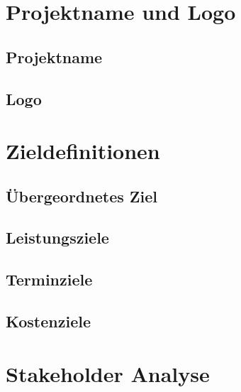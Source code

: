 
\section{Projektname und Logo}\label{sec:projektname_und_logo}


\subsection{Projektname}\label{subsec:projektname}


\subsection{Logo}\label{subsec:logo}


\section{Zieldefinitionen}\label{sec:zieldefinitionen}


\subsection{Übergeordnetes Ziel}\label{subsec:uebergeordnetes_ziel}


\subsection{Leistungsziele}\label{subsec:leistungsziele}


\subsection{Terminziele}\label{subsec:terminziele}


\subsection{Kostenziele}\label{subsec:kostenziele}


\section{Stakeholder Analyse}\label{sec:stakeholder_analyse}



